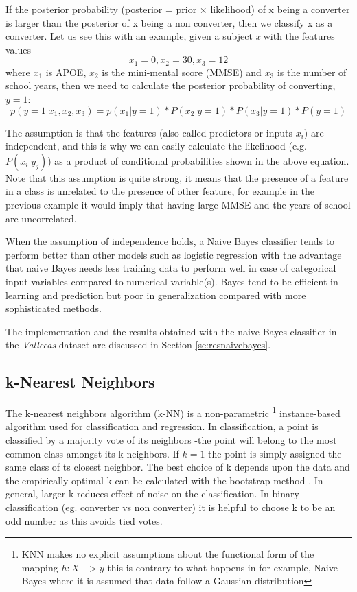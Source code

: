 \documentclass[11pt]{article}
\theoremstyle{definition}
\theoremstyle{remark}
\begin{document}
If the posterior probability (posterior = prior $\times$ likelihood) of x being a converter is larger than the posterior of x being a non converter, then we classify x as a converter. Let us see this with an example, given a subject \emph{x} with the features values 
\begin{equation*}
x_1 = 0, x_2=30, x_3=12
\end{equation*}
where $x_1$ is APOE, $x_2$ is the mini-mental score (MMSE) and $x_3$ is the number of school years, then we need to calculate the 
posterior probability of converting, $y=1$:
\begin{equation*}
p(y=1|x_1,x_2,x_3) = p(x_1|y=1) * P(x_2|y=1) * P(x_3|y=1) * P(y=1)
\end{equation*}

The assumption is that the features (also called predictors or inputs $x_i$) are independent, and this is why we can easily calculate the likelihood (e.g. $P(x_i|y_j)$) as a product of conditional probabilities shown in the above equation. Note that this assumption is quite strong, it means that the presence of a feature in a class is unrelated to the presence of other feature, for example in the previous example it would imply that having large MMSE and the years of school are uncorrelated.

When the assumption of independence holds, a Naive Bayes classifier tends to perform better than other models such as logistic regression with the advantage that naive Bayes needs less training data to perform well in case of categorical input variables compared to numerical variable(s). %
Bayes tend to be efficient in learning and prediction but poor in generalization compared with more sophisticated methods.

The implementation and the results obtained with the naive Bayes classifier in the \emph{Vallecas} dataset are discussed in Section \ref{se:resnaivebayes}.

\subsection{k-Nearest Neighbors}
\label{sse:kneighbors}

The k-nearest neighbors algorithm (k-NN) is a non-parametric \footnote{KNN makes no explicit assumptions about the functional form of the mapping $h:X->y$ this is contrary to what happens in for example, Naive Bayes where it is assumed that data follow a Gaussian distribution} instance-based algorithm used for classification and regression. In classification, a point is classified by a majority vote of its neighbors -the point will belong to the most common class amongst its k neighbors. If $k=1$ the point is simply assigned the same class of ts closest neighbor. The best choice of k depends upon the data and the empirically optimal k can be calculated with the bootstrap method \cite{steele2009exact}. In general, larger k reduces effect of noise on the classification. In binary classification (eg. converter vs non converter) it is helpful to choose k to be an odd number as this avoids tied votes.
\end{document}
